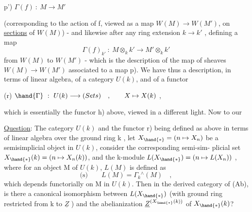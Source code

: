 
\hand{(}p') \qquad $\Gamma(f) \ : \ M \to M'$

(corresponding to the action of f, viewed as a map $W(M)\to W(M')$, on
\uline{sections} of $W(M)$) - and likewise after any ring extension $k\to k'$ ,
defining a map
\[ \Gamma(f)_{k'} \ : \ M\otimes_k k' \to M'\otimes_k k' \]
from $W(M)$ to $W(M')$ - which is the description of the map of sheaves
$W(M)\longrightarrow W(M')$ associated to a map \hand{(}p). We have thus a description, in
terms of linear algebra, of a category $U(k)$, and of a  functor

(r) \qquad $\hand{\Gamma} \ : \ U(k) \longrightarrow (Sets) \quad , \qquad X \mapsto X(k)$ ,

which is essentially the functor \hand{(}h) above, viewed in a different light.
Now to our

\uline{Question}: \margin{\unsure{$\#$}}The category $U(k)$ and the functor r) being defined as above
in terms of linear algebra over the ground ring k , let $X_{\hand{*}} = (n\mapsto X_n)$
be a semisimplicial object in $U(k)$, consider the corresponding semi-sim-%
plicial set $X_{\hand{*}}(k) = (n\mapsto X_n(k))$, and the  k-module
$L(X_{\hand{*}}) = (n\mapsto L(X_n))$ , where for an object M of $U(k)$, $L(M)$ is defined as
\[ \text{(s)} \qquad L(M) = \Gamma_k{}^{\wedge}(M) \quad , \]
which depends functorially on M in $U(k)$. Then in the derived category
of (Ab), is there a canonical isomorphism between $L(X_{\hand{*}})$ (with ground
ring restricted from k to $\underline{Z}$ ) and the abelianization $\underline{Z}^{(X_{\hand{*}}(k))}$ of $X_{\hand{*}}(k)$?

